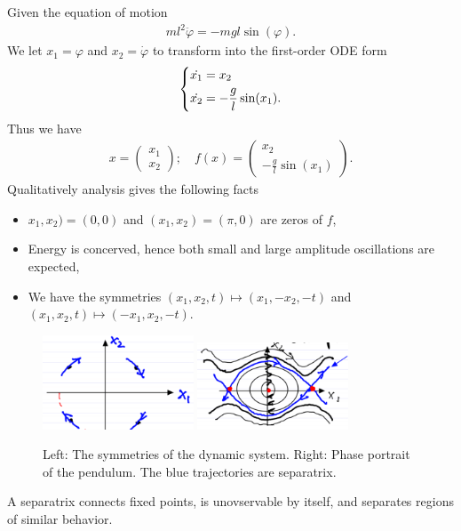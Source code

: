 \begin{ex}[Pendulum]
Given the equation of motion
\begin{align}
	ml^2 \ddot{\varphi} = -mgl \sin(\varphi).
\end{align}
We let $x_1 = \varphi$ and $x_2 =\dot{\varphi}$ to transform into the first-order ODE form
\begin{align}
	\begin{dcases}
		\dot{x_1} = x_2 \\
		\dot{x_2} = - \frac{g}{l} \sin (x_1).
	\end{dcases}
\end{align}
Thus we have 
\begin{align}
x = 
\begin{pmatrix}
	x_1 \\ x_2
\end{pmatrix}; \quad
f(x) = 
\begin{pmatrix}
	x_2 \\ - \frac{g}{l}\sin(x_1)	
\end{pmatrix}.
\end{align}
Qualitatively analysis gives the following facts
\begin{itemize}
	\item $x_1, x_2) = (0,0)$ and $(x_1, x_2) = (\pi , 0)$ are zeros of $f$,
	\item Energy is concerved, hence both small and large amplitude oscillations are expected,
	\item We have the symmetries $(x_1, x_2, t) \mapsto (x_1, -x_2, -t)$ and $(x_1, x_2, t) \mapsto (-x_1, x_2, -t)$.
\end{itemize}
\begin{figure}[h]
	\centering
	\includegraphics[width=0.4\textwidth]{figures/intro/6pendulum_symmetries.png}
	\hspace{0.05\textwidth}
	\includegraphics[width=0.4\textwidth]{figures/intro/5pendulum.png}
	\caption{Left: The symmetries of the dynamic system. Right: Phase portrait of the pendulum. The blue trajectories are separatrix.}
\end{figure}
\begin{definition}
	A separatrix connects fixed points, is unovservable by itself, and separates regions of similar behavior.
\end{definition}

\end{ex}

